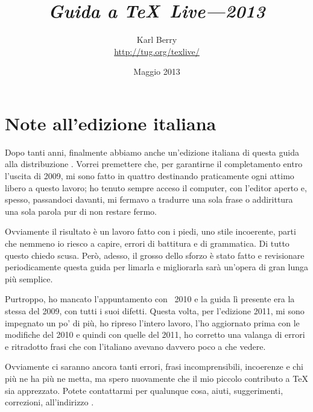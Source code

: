 \documentclass{article}
\begin{document}
\title{%
  {\huge \textit{Guida a \TeX\ Live---2013}}
}

\author{Karl Berry\\[3mm]
        \url{http://tug.org/texlive/}
       }

\date{Maggio 2013}

\maketitle

\begin{multicols}{2}
\tableofcontents
\end{multicols}


\section*{Note all'edizione italiana}

Dopo tanti anni, finalmente abbiamo anche un'edizione italiana di questa
guida alla distribuzione \TL. Vorrei premettere che, per garantirne il
completamento entro l'uscita di \TL{} 2009, mi sono fatto in quattro
destinando praticamente ogni attimo libero a questo lavoro; ho tenuto
sempre acceso il computer, con l'editor aperto e, spesso, passandoci
davanti, mi fermavo a tradurre una sola frase o addirittura una sola
parola pur di non restare fermo.

Ovviamente il risultato è un lavoro fatto con i piedi, uno stile
incoerente, parti che nemmeno io riesco a capire, errori di battitura e di
grammatica. Di tutto questo chiedo scusa. Però, adesso, il grosso dello
sforzo è stato fatto e revisionare periodicamente questa guida per limarla
e migliorarla sarà un'opera di gran lunga più semplice.

Purtroppo, ho mancato l'appuntamento con \TL\ 2010 e la guida lì presente
era la stessa del 2009, con tutti i suoi difetti. Questa volta, per
l'edizione 2011, mi sono impegnato un po' di più, ho ripreso l'intero
lavoro, l'ho aggiornato prima con le modifiche del 2010 e quindi con quelle
del 2011, ho corretto una valanga di errori e ritradotto frasi che con
l'italiano avevano davvero poco a che vedere.

Ovviamente ci saranno ancora tanti errori, frasi incomprensibili, incoerenze
e chi più ne ha più ne metta, ma spero nuovamente che il mio piccolo
contributo a \TeX{} sia apprezzato. Potete contattarmi per qualunque cosa,
aiuti, suggerimenti, correzioni, all'indirizzo
.
\end{document}

